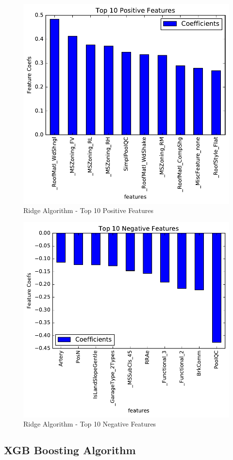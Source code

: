 \documentclass[sigconf]{acmart}
\begin{document}
	\begin{figure}[H]
		\centering
		\includegraphics[width=0.8\columnwidth]{images/ridge_feature_ranking_pos}	
		\caption{Ridge Algorithm - Top 10 Positive Features} \label{fig:ridge_feature_ranking_pos} 
	\end{figure}
	
	\begin{figure}[H]
		\centering
		\includegraphics[width=0.8\columnwidth]{images/ridge_feature_ranking_neg}	
		\caption{Ridge Algorithm - Top 10 Negative Features} \label{fig:ridge_feature_ranking_neg} 
	\end{figure}
	
	\subsection{XGB Boosting Algorithm}
	
\end{document}
